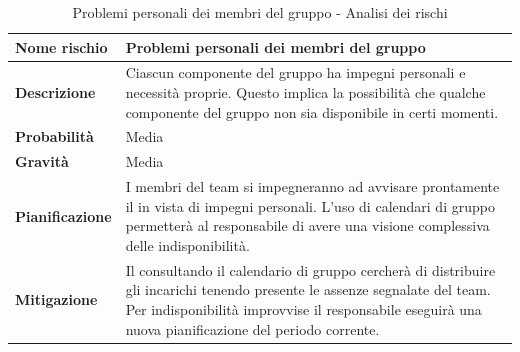 \documentclass[12pt,a4paper]{article}
\begin{document}
\begin{table}[H]
	\begin{center}
		\begin{tabular}{p{} p{}}
			\toprule
			\textbf{Nome rischio} & \textbf{Problemi personali dei membri del gruppo} \\
			\midrule
			\midrule
			\textbf{Descrizione} & Ciascun componente del gruppo ha impegni personali e necessità proprie. Questo implica la possibilità che qualche componente del gruppo non sia disponibile in certi momenti. \\
			\midrule
			\textbf{Probabilità} & Media \\
			\midrule
			\textbf{Gravità} & Media \\
			\midrule
			\textbf{Pianificazione} & I membri del team si impegneranno ad avvisare prontamente il \PM{} in vista di impegni personali. L’uso di calendari di gruppo permetterà al responsabile di avere una visione complessiva delle indisponibilità.  \\
			\midrule
			\textbf{Mitigazione} & Il \PM{} consultando il calendario di gruppo cercherà di distribuire gli incarichi tenendo presente le assenze segnalate del team. Per indisponibilità improvvise il responsabile eseguirà una nuova pianificazione del periodo corrente. \\
			\bottomrule
		\end{tabular}
		\caption{Problemi personali dei membri del gruppo - Analisi dei rischi}
	\end{center}
\end{table}
\end{document}
